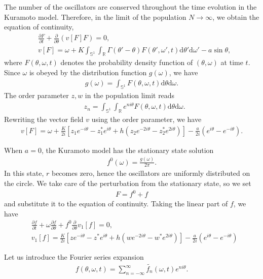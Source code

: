 \documentclass{article}
\def\d{\textrm{d}}
\begin{document}
The number of the oscillators are conserved throughout
the time evolution in the Kuramoto model.
Therefore, in the limit of the population $N\to\infty$,
we obtain the equation of continuity,
\begin{align}
&\frac{\partial F}{\partial t}+\frac{\partial}{\partial\theta}
\left(v[F]F\right)=0,\\
&v[F]=\omega+K\int_{\mathbb{S}^{1}}\int_{\mathbb{R}}
\Gamma(\theta'-\theta)F(\theta',\omega',t)\d\theta'\d\omega'-a\sin\theta,
\end{align}
where $F(\theta,\omega,t)$ denotes the probability density function
of $(\theta,\omega)$ at time $t$.
Since $\omega$ is obeyed by the distribution function $g(\omega)$,
we have
\begin{align}
g(\omega)=\int_{\mathbb{S}^{1}}F(\theta,\omega,t)\d\theta\d\omega.
\end{align}
The order parameter $z,w$ in the population limit reads
\begin{align}
&z_{n}=\int_{\mathbb{S}^{1}}\int_{\mathbb{R}}e^{ni\theta}F(\theta,\omega,t)\d\theta\d\omega.
\end{align}
Rewriting the vector field $v$ using the order parameter,
we have
\begin{align}
v[F]=\omega+\frac{K}{2i}\left[z_{1}e^{-i\theta}-z_{1}^{*}e^{i\theta}
+h\left(z_{2}e^{-2i\theta}-z_{2}^{*}e^{2i\theta}\right)\right]
-\frac{a}{2i}\left(e^{i\theta}-e^{-i\theta}\right).
\end{align}

When $a=0$, the Kuramoto model has the stationary state solution
\begin{align}
f^{0}(\omega)=\frac{g(\omega)}{2\pi}.
\end{align}
In this state, $r$ becomes zero,
hence the oscillators are uniformly distributed on the circle.
We take care of the perturbation from the stationary state,
so we set 
\begin{align}
	F=f^{0}+f
\end{align}
and substitute it to the equation of continuity.
Taking the linear part of $f$, we have
\begin{align}
&\frac{\partial f}{\partial t}
+\omega\frac{\partial f}{\partial\theta}
+f^{0}\frac{\partial}{\partial\theta}v_{1}[f]
=0,\\
&v_{1}[f]=\frac{K}{2i}\left[ze^{-i\theta}-z^{*}e^{i\theta}
+h\left(we^{-2i\theta}-w^{*}e^{2i\theta}\right)\right]
-\frac{a}{2i}\left(e^{i\theta}-e^{-i\theta}\right)
\end{align}

Let us introduce the Fourier series expansion
\begin{align}
f(\theta,\omega,t)=\sum_{n=-\infty}^{\infty}\tilde{f_{n}}(\omega,t)e^{ni\theta}.
\end{align}
\end{document}

